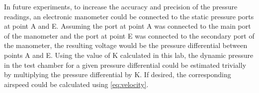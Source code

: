 In future experiments, to increase the accuracy and precision of the pressure readings, an electronic manometer could be connected to the static pressure ports at point A and E. Assuming the port at point A was connected to the main port of the manometer and the port at point E was connected to the secondary port of the manometer, the resulting voltage would be the pressure differential between points A and E. Using the value of \gls{K} calculated in this lab, the dynamic pressure in the test chamber for a given pressure differential could be estimated trivially by multiplying the pressure differential by \gls{K}. If desired, the corresponding airspeed could be calculated using \autoref{eq:velocity}.